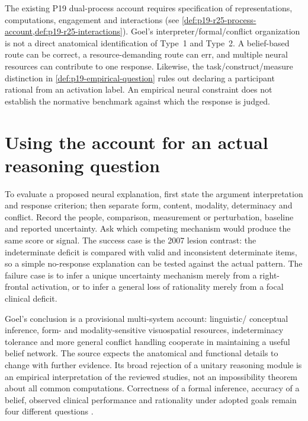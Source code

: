 The existing P19 dual-process account requires specification of
representations, computations, engagement and interactions
(see \cref{def:p19-r25-process-account,def:p19-r25-interactions}). Goel's
interpreter/formal/conflict organization is not a direct anatomical
identification of Type~1 and Type~2. A belief-based route can be correct,
a resource-demanding route can err, and multiple neural resources can
contribute to one response. Likewise, the task/construct/measure
distinction in \cref{def:p19-empirical-question} rules out declaring a
participant rational from an activation label. An empirical neural
constraint does not establish the normative benchmark against which
the response is judged.

\section{Using the account for an actual reasoning question}
\label{sec:p19-r14-use}

To evaluate a proposed neural explanation, first state the argument
interpretation and response criterion; then separate form, content,
modality, determinacy and conflict. Record the people, comparison,
measurement or perturbation, baseline and reported uncertainty. Ask
which competing mechanism would produce the same score or signal.
The success case is the 2007 lesion contrast: the indeterminate deficit
is compared with valid and inconsistent determinate items, so a simple
no-response explanation can be tested against the actual pattern.
The failure case is to infer a unique uncertainty mechanism merely
from a right-frontal activation, or to infer a general loss of
rationality merely from a focal clinical deficit.

Goel's conclusion is a provisional multi-system account: linguistic/
conceptual inference, form- and modality-sensitive visuospatial
resources, indeterminacy tolerance and more general conflict handling
cooperate in maintaining a useful belief network. The source expects
the anatomical and functional details to change with further evidence.
Its broad rejection of a unitary reasoning module is an empirical
interpretation of the reviewed studies, not an impossibility theorem
about all common computations. Correctness of a formal inference,
accuracy of a belief, observed clinical performance and rationality
under adopted goals remain four different questions
\cite[pp.~123--124]{Goel2021RationalityBrain}.
